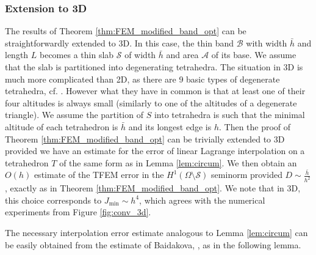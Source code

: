 \documentclass{article}
\theoremstyle{remark}
\def\B{\mathcal{B}}
\newcommand{\Jmin}{J_{\text{min}}}
\begin{document}
\subsubsection*{Extension to 3D}
The results of Theorem \ref{thm:FEM_modified_band_opt} can be straightforwardly extended to 3D. In this case, the thin band $\B$ with width $\bar{h}$ and length $L$ becomes a thin slab $\mathcal{S}$ of width $\bar{h}$ and area $\mathcal{A}$ of its base. We assume that the slab 
is partitioned into degenerating tetrahedra. The situation in 3D is much more complicated than 2D, as there are 9 basic types of degenerate tetrahedra, cf. \cite{Krizek}. However what they have in common is that at least one of their four altitudes is always small (similarly to one of the altitudes of a degenerate triangle). We assume the partition of $S$ into tetrahedra is such that the minimal altitude of each tetrahedron is $\bar{h}$ and its longest edge is $h$. Then the proof of Theorem \ref{thm:FEM_modified_band_opt} can be trivially extended to 3D provided we have an estimate for the error of linear Lagrange interpolation on a tetrahedron $T$ of the same form as in Lemma \ref{lem:circum}. We then obtain an $O(h)$ estimate of the TFEM error in the $H^1(\Omega\setminus \mathcal{S})$ seminorm provided $D\sim \frac{\bar{h}}{h^2}$, exactly as in Theorem \ref{thm:FEM_modified_band_opt}. We note that in 3D, this choice corresponds to $\Jmin\sim h^4$, which agrees with the numerical experiments from Figure \ref{fig:conv_3d}.

The necessary interpolation error estimate analogous to Lemma \ref{lem:circum} can be easily obtained from the estimate of Baidakova, \cite{Baidakova}, as in the following lemma.
\end{document}
